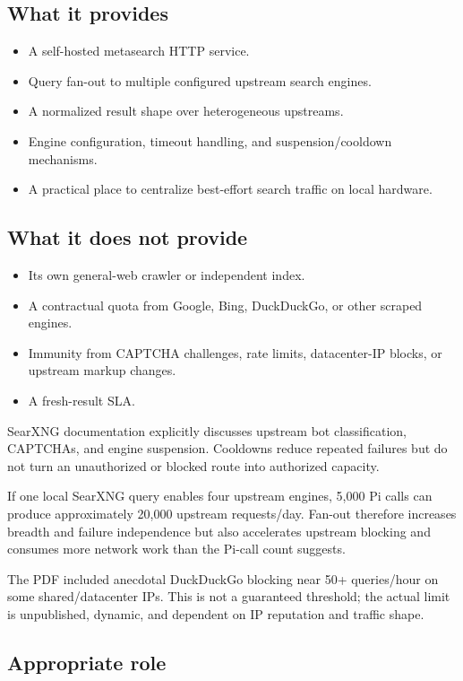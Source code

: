 \documentclass[11pt]{article}
\begin{document}
\subsection*{What it provides}
\label{sec:org8f09f08}

\begin{itemize}
\item A self-hosted metasearch HTTP service.
\item Query fan-out to multiple configured upstream search engines.
\item A normalized result shape over heterogeneous upstreams.
\item Engine configuration, timeout handling, and suspension/cooldown mechanisms.
\item A practical place to centralize best-effort search traffic on local hardware.
\end{itemize}
\subsection*{What it does not provide}
\label{sec:org6c8b86b}

\begin{itemize}
\item Its own general-web crawler or independent index.
\item A contractual quota from Google, Bing, DuckDuckGo, or other scraped engines.
\item Immunity from CAPTCHA challenges, rate limits, datacenter-IP blocks, or
upstream markup changes.
\item A fresh-result SLA.
\end{itemize}

SearXNG documentation explicitly discusses upstream bot classification,
CAPTCHAs, and engine suspension.  Cooldowns reduce repeated failures but do not
turn an unauthorized or blocked route into authorized capacity.

If one local SearXNG query enables four upstream engines, 5,000 Pi calls can
produce approximately 20,000 upstream requests/day.  Fan-out therefore
increases breadth and failure independence but also accelerates upstream
blocking and consumes more network work than the Pi-call count suggests.

The PDF included anecdotal DuckDuckGo blocking near 50+ queries/hour on some
shared/datacenter IPs.  This is not a guaranteed threshold; the actual limit is
unpublished, dynamic, and dependent on IP reputation and traffic shape.
\subsection*{Appropriate role}
\label{sec:org6a0c93f}
\end{document}
